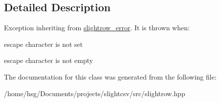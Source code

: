 \subsection{Detailed Description}
Exception inheriting from \hyperlink{classutils_1_1slightrow__error}{slightrow\+\_\+error}. It is thrown when\+:
\begin{DoxyItemize}
\item escape character is not set
\item escape character is not empty 
\end{DoxyItemize}

The documentation for this class was generated from the following file\+:\begin{DoxyCompactItemize}
\item 
/home/hsg/\+Documents/projects/slightcsv/src/slightrow.\+hpp\end{DoxyCompactItemize}
